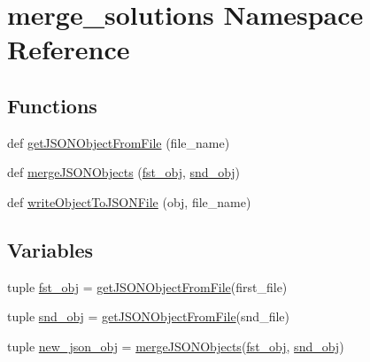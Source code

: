 \hypertarget{namespacemerge__solutions}{}\section{merge\+\_\+solutions Namespace Reference}
\label{namespacemerge__solutions}
\subsection*{Functions}
\begin{DoxyCompactItemize}
\item 
def \hyperlink{namespacemerge__solutions_ad0fda986a1c53a874ed095ef12027877}{get\+J\+S\+O\+N\+Object\+From\+File} (file\+\_\+name)
\item 
def \hyperlink{namespacemerge__solutions_afdaea17f186be2b756193101925af3a5}{merge\+J\+S\+O\+N\+Objects} (\hyperlink{namespacemerge__solutions_a1a4d70efbd1013729dbfce1d0c9ef25b}{fst\+\_\+obj}, \hyperlink{namespacemerge__solutions_a5b10d08f2e1f7a3c0660a4350142c13d}{snd\+\_\+obj})
\item 
def \hyperlink{namespacemerge__solutions_a9433a06eec90ce10b69902cf0e17ff69}{write\+Object\+To\+J\+S\+O\+N\+File} (obj, file\+\_\+name)
\end{DoxyCompactItemize}
\subsection*{Variables}
\begin{DoxyCompactItemize}
\item 
tuple \hyperlink{namespacemerge__solutions_a1a4d70efbd1013729dbfce1d0c9ef25b}{fst\+\_\+obj} = \hyperlink{namespacemerge__solutions_ad0fda986a1c53a874ed095ef12027877}{get\+J\+S\+O\+N\+Object\+From\+File}(first\+\_\+file)
\item 
tuple \hyperlink{namespacemerge__solutions_a5b10d08f2e1f7a3c0660a4350142c13d}{snd\+\_\+obj} = \hyperlink{namespacemerge__solutions_ad0fda986a1c53a874ed095ef12027877}{get\+J\+S\+O\+N\+Object\+From\+File}(snd\+\_\+file)
\item 
tuple \hyperlink{namespacemerge__solutions_af6f16aad7bb6f378fbaaa508f8afd746}{new\+\_\+json\+\_\+obj} = \hyperlink{namespacemerge__solutions_afdaea17f186be2b756193101925af3a5}{merge\+J\+S\+O\+N\+Objects}(\hyperlink{namespacemerge__solutions_a1a4d70efbd1013729dbfce1d0c9ef25b}{fst\+\_\+obj}, \hyperlink{namespacemerge__solutions_a5b10d08f2e1f7a3c0660a4350142c13d}{snd\+\_\+obj})
\end{DoxyCompactItemize}


